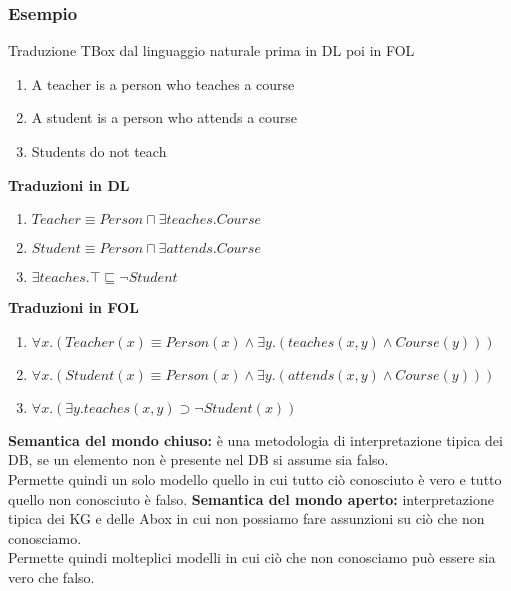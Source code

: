 \documentclass[../main.tex]{subfiles}
\begin{document}
   \subsubsection{Esempio}
   Traduzione TBox dal linguaggio naturale prima in DL poi in FOL
   \begin{enumerate}
      \item A teacher is a person who teaches a course
      \item A student is a person who attends a course
      \item Students do not teach
   \end{enumerate}
   \begin{minipage}{0.5\textwidth}
      \textbf{Traduzioni in DL}
      \begin{enumerate}
         \item $Teacher \equiv Person \sqcap \exists teaches.Course$
         \item $Student \equiv Person \sqcap \exists attends.Course$
         \item $\exists teaches. \top \sqsubseteq \lnot Student$
      \end{enumerate} 
   \end{minipage}
   \begin{minipage}{0.5\textwidth}
      \textbf{Traduzioni in FOL}
      \begin{enumerate}
         \item $\forall x.(Teacher(x) \equiv Person(x) \land \exists y .(teaches(x,y) \land Course(y)))$
         \item $\forall x.(Student(x) \equiv Person(x) \land \exists y .(attends(x,y) \land Course(y)))$
         \item $\forall x.(\exists y.teaches(x,y) \supset \lnot Student(x))$
      \end{enumerate}
   \end{minipage}
   \spazio
   \textbf{Semantica del mondo chiuso:} è una metodologia di interpretazione tipica dei DB, se un elemento non è presente nel DB si assume sia falso.\\
   Permette quindi un solo modello quello in cui tutto ciò conosciuto è vero e tutto quello non conosciuto è falso.
   \spazio
   \textbf{Semantica del mondo aperto:} interpretazione tipica dei KG e delle Abox in cui non possiamo fare assunzioni su ciò che non conosciamo.\\
   Permette quindi molteplici modelli in cui ciò che non conosciamo può essere sia vero che falso.
\end{document}
